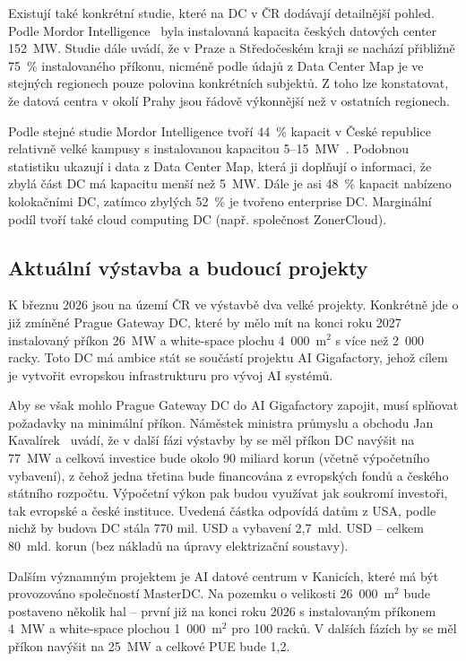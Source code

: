 Existují také konkrétní studie, které na DC v ČR dodávají detailnější pohled. Podle Mordor Intelligence~\cite{mordor_intelligence_czechia_2025} byla instalovaná kapacita českých datových center 152~MW. Studie dále uvádí, že v Praze a Středočeském kraji se nachází přibližně 75~\% instalovaného příkonu, nicméně podle údajů z Data Center Map je ve stejných regionech pouze polovina konkrétních subjektů. Z toho lze konstatovat, že datová centra v okolí Prahy jsou řádově výkonnější než v ostatních regionech.

Podle stejné studie Mordor Intelligence tvoří 44~\% kapacit v České republice relativně velké kampusy s instalovanou kapacitou 5--15~MW~\cite{mordor_intelligence_czechia_2025}. Podobnou statistiku ukazují i data z Data Center Map, která ji doplňují o informaci, že zbylá část DC má kapacitu menší než 5~MW. Dále je asi 48~\% kapacit nabízeno kolokačními DC, zatímco zbylých 52~\% je tvořeno enterprise DC. Marginální podíl tvoří také cloud computing DC (např. společnost ZonerCloud).

\subsection{Aktuální výstavba a budoucí projekty}
\label{subsec:cz_trh_budoucnost}

K březnu 2026 jsou na území ČR ve výstavbě dva velké projekty. Konkrétně jde o již zmíněné Prague Gateway DC, které by mělo mít na konci roku 2027 instalovaný příkon 26~MW a white-space plochu 4~000~m$^2$ s více než 2~000 racky. Toto DC má ambice stát se součástí projektu AI Gigafactory, jehož cílem je vytvořit evropskou infrastrukturu pro vývoj AI systémů.~\cite{cra_ceske_2025, prochazka_sef_2026}

Aby se však mohlo Prague Gateway DC do AI Gigafactory zapojit, musí splňovat požadavky na minimální příkon. Náměstek ministra průmyslu a obchodu Jan Kavalírek~\cite{richter_gigatovarna_2025} uvádí, že v další fázi výstavby by se měl příkon DC navýšit na 77~MW a celková investice bude okolo 90 miliard korun (včetně výpočetního vybavení), z čehož jedna třetina bude financována z evropských fondů a českého státního rozpočtu. Výpočetní výkon pak budou využívat jak soukromí investoři, tak evropské a české instituce. Uvedená částka odpovídá datům z USA, podle nichž by budova DC stála 770 mil. USD a vybavení 2,7~mld. USD -- celkem 80~mld. korun (bez nákladů na úpravy elektrizační soustavy).

Dalším významným projektem je AI datové centrum v Kanicích, které má být provozováno společností MasterDC. Na pozemku o velikosti 26~000~m$^2$ bude postaveno několik hal -- první již na konci roku 2026 s instalovaným příkonem 4~MW a white-space plochou 1~000~m$^2$ pro 100 racků. V dalších fázích by se měl příkon navýšit na 25~MW a celkové PUE bude 1,2.~\cite{rabasova_u_2025}

